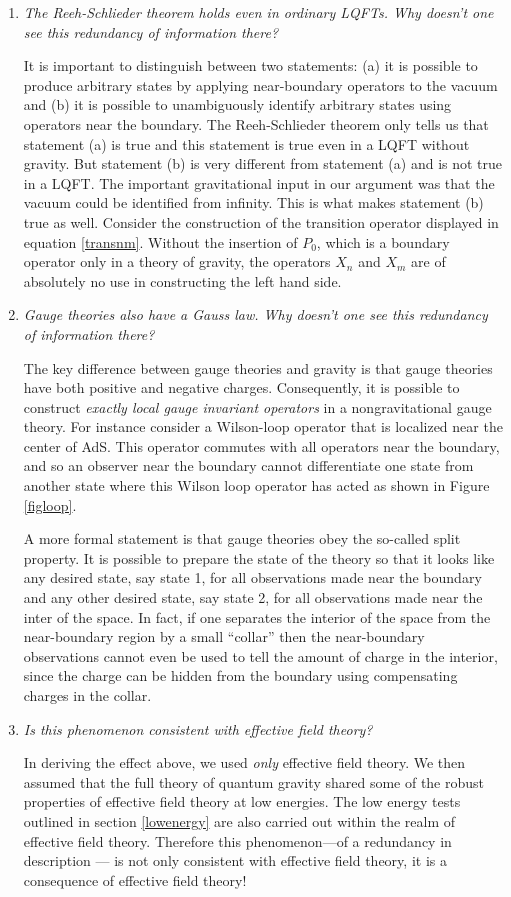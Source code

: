 \documentclass[12pt]{article}
\def\projvac{{\cal P}_{\Omega}}
\def\projvac{P_0}
\begin{document}
\begin{enumerate}[qseries]
\item
{\em The Reeh-Schlieder theorem holds even in ordinary LQFTs. Why doesn't one see this redundancy of information there?} 

It is important to distinguish between two statements: (a) it is possible to produce arbitrary states by applying near-boundary operators to the vacuum and (b) it is possible to unambiguously identify arbitrary states
using operators near the boundary. The Reeh-Schlieder theorem only tells us that statement (a) is true and this statement is true even in a LQFT without gravity. But statement (b) is very different from statement (a) and is not true in a LQFT. The important gravitational input in our argument was that the vacuum could be identified from infinity. This is what makes statement (b) true as well. Consider the construction of the transition operator displayed in equation \eqref{transnm}. Without the insertion of $\projvac$, which is a boundary operator only in a theory of gravity, the operators $X_n$ and $X_m$ are of absolutely no use in constructing the left hand side.
\item
{\em Gauge theories also have a Gauss law. Why doesn't one see this redundancy of information there?} 

The key difference between gauge theories and gravity is that gauge theories have both positive and negative charges. Consequently, it is possible to construct {\em exactly local gauge invariant operators} in a nongravitational 
gauge theory. For instance consider a Wilson-loop operator that is localized near the center of AdS. This operator commutes with all operators near the boundary, and so an observer near the boundary cannot differentiate one state
from another state where this Wilson loop operator has acted as shown in Figure \ref{figloop}.

A more formal statement is that gauge theories obey the so-called split property. It is possible to prepare the state of the theory so that it looks like any desired state, say state 1, for all observations made near the boundary
and any other desired state, say state 2, for all observations made near the inter of the space. In fact, if one separates the interior of the space from the near-boundary region by a small ``collar'' then the near-boundary observations cannot even be used to tell the amount of charge in the interior, since the charge can be hidden from the boundary using compensating charges in the collar.
\item
{\em Is this phenomenon consistent with effective field theory?} 

In deriving the effect above, we used {\em only} effective field theory. We then  assumed that the full theory of quantum gravity shared some of the robust properties of effective field theory at low energies.  The low energy tests outlined in section \ref{lowenergy} are also carried out within the realm of effective field theory.  Therefore this phenomenon---of a redundancy in description --- is not only consistent with effective field theory, it is a consequence of effective field theory!



\end{enumerate}
\end{document}
